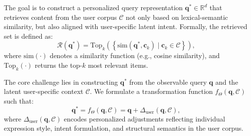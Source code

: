 

The goal is to construct a personalized query representation \(\mathbf{q}^* \in \mathbb{R}^d\) that retrieves content from the user corpus \(\mathcal{C}\) not only based on lexical-semantic similarity, but also aligned with user-specific latent intent. Formally, the retrieved set is defined as:
\begin{equation}
\mathcal{R}(\mathbf{q}^*) = \text{Top}_k\left( \left\{ \text{sim}(\mathbf{q}^*, \mathbf{c}_k) \mid \mathbf{c}_k \in \mathcal{C} \right\} \right),
\end{equation}
where \(\text{sim}(\cdot)\) denotes a similarity function (e.g., cosine similarity), and \(\text{Top}_k(\cdot)\) returns the top-\(k\) most relevant items.

The core challenge lies in constructing \(\mathbf{q}^*\) from the observable query \(\mathbf{q}\) and the latent user-specific context \(\mathcal{C}\). We formulate a transformation function \(f_\Theta(\mathbf{q}, \mathcal{C})\) such that:
\begin{equation}
\mathbf{q}^* = f_\Theta(\mathbf{q}, \mathcal{C}) = \mathbf{q} + \Delta_{\text{user}}(\mathbf{q}, \mathcal{C}),
\end{equation}
where \(\Delta_{\text{user}}(\mathbf{q}, \mathcal{C})\) encodes personalized adjustments reflecting individual expression style, intent formulation, and structural semantics in the user corpus.



